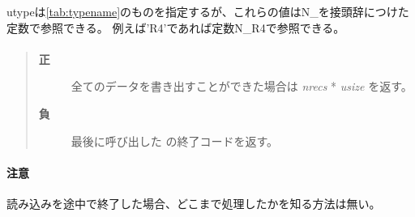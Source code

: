 utypeは\ref{tab:typename}のものを指定するが、これらの値はN\_を接頭辞につけた定数で参照できる。
例えば'R4'であれば定数N\_R4で参照できる。

\paragraph{\ResultCode}
\begin{quote}
\begin{description}
\item[{\bf 正}] 全てのデータを書き出すことができた場合は {\it nrecs} * {\it usize} を返す。
\item[{\bf 負}] 最後に呼び出した  の終了コードを返す。
\end{description}\end{quote}

\paragraph{注意}
読み込みを途中で終了した場合、どこまで処理したかを知る方法は無い。
